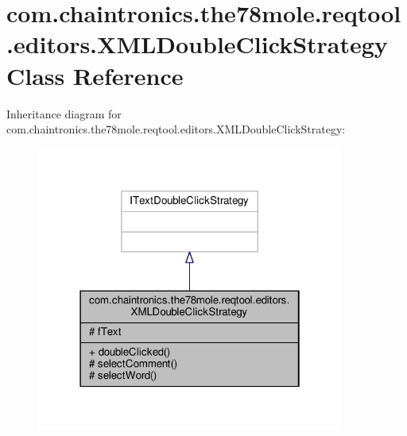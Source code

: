 \hypertarget{classcom_1_1chaintronics_1_1the78mole_1_1reqtool_1_1editors_1_1XMLDoubleClickStrategy}{}\section{com.\+chaintronics.\+the78mole.\+reqtool.\+editors.\+X\+M\+L\+Double\+Click\+Strategy Class Reference}
\label{classcom_1_1chaintronics_1_1the78mole_1_1reqtool_1_1editors_1_1XMLDoubleClickStrategy}


Inheritance diagram for com.\+chaintronics.\+the78mole.\+reqtool.\+editors.\+X\+M\+L\+Double\+Click\+Strategy\+:\nopagebreak
\begin{figure}[H]
\begin{center}
\leavevmode
\includegraphics[width=286pt]{da/d27/classcom_1_1chaintronics_1_1the78mole_1_1reqtool_1_1editors_1_1XMLDoubleClickStrategy__inherit__graph}
\end{center}
\end{figure}


